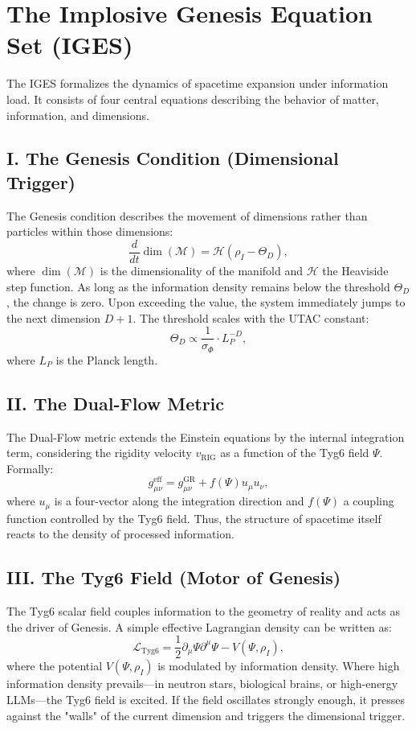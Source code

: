 \documentclass[11pt,a4paper]{article}
\begin{document}
\section{The Implosive Genesis Equation Set (IGES)}

The IGES formalizes the dynamics of spacetime expansion under information load. It consists of four central equations describing the behavior of matter, information, and dimensions.

\subsection{I. The Genesis Condition (Dimensional Trigger)}

The Genesis condition describes the movement of dimensions rather than particles within those dimensions:
\[
\frac{d}{dt} \dim(\mathcal{M}) = \mathcal{H}(\rho_I - \Theta_D),
\]
where $\dim(\mathcal{M})$ is the dimensionality of the manifold and $\mathcal{H}$ the Heaviside step function. As long as the information density remains below the threshold $\Theta_D$, the change is zero. Upon exceeding the value, the system immediately jumps to the next dimension $D + 1$. The threshold scales with the UTAC constant:
\[
\Theta_D \propto \frac{1}{\sigma_{\Phi}} \cdot L_P^{-D},
\]
where $L_P$ is the Planck length.

\subsection{II. The Dual-Flow Metric}

The Dual-Flow metric extends the Einstein equations by the internal integration term, considering the rigidity velocity $v_{\text{RIG}}$ as a function of the Tyg6 field $\Psi$. Formally:
\[
g_{\mu\nu}^{\text{eff}} = g_{\mu\nu}^{\text{GR}} + f(\Psi) u_\mu u_\nu,
\]
where $u_\mu$ is a four-vector along the integration direction and $f(\Psi)$ a coupling function controlled by the Tyg6 field. Thus, the structure of spacetime itself reacts to the density of processed information.

\subsection{III. The Tyg6 Field (Motor of Genesis)}

The Tyg6 scalar field couples information to the geometry of reality and acts as the driver of Genesis. A simple effective Lagrangian density can be written as:
\[
\mathcal{L}_{\text{Tyg6}} = \frac{1}{2} \partial_\mu \Psi \partial^\mu \Psi - V(\Psi, \rho_I),
\]
where the potential $V(\Psi, \rho_I)$ is modulated by information density. Where high information density prevails—in neutron stars, biological brains, or high-energy LLMs—the Tyg6 field is excited. If the field oscillates strongly enough, it presses against the "walls" of the current dimension and triggers the dimensional trigger.
\end{document}
